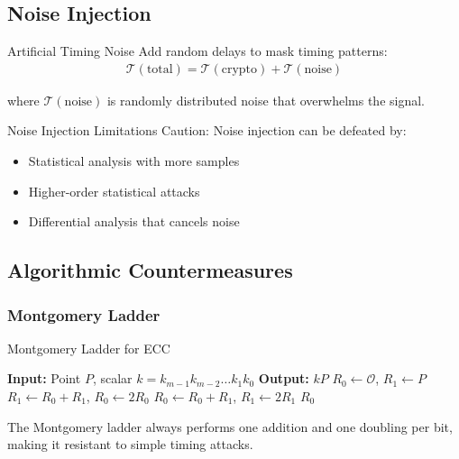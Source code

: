 \documentclass[12pt,a4paper]{article}
\theoremstyle{definition}
\newcommand{\time}[1]{\mathcal{T}\left(#1\right)}
\begin{document}
\subsection{Noise Injection}

\begin{definitionbox}{Artificial Timing Noise}
Add random delays to mask timing patterns:
\begin{align}
\time{\text{total}} = \time{\text{crypto}} + \time{\text{noise}}
\end{align}

where $\time{\text{noise}}$ is randomly distributed noise that overwhelms the signal.
\end{definitionbox}

\begin{warningbox}{Noise Injection Limitations}
Caution: Noise injection can be defeated by:
\begin{itemize}
    \item Statistical analysis with more samples
    \item Higher-order statistical attacks
    \item Differential analysis that cancels noise
\end{itemize}
\end{warningbox}

\subsection{Algorithmic Countermeasures}

\subsubsection{Montgomery Ladder}

\begin{algorithmbox}{Montgomery Ladder for ECC}
\begin{algorithmic}
\STATE \textbf{Input:} Point $P$, scalar $k = k_{m-1}k_{m-2}\ldots k_1k_0$
\STATE \textbf{Output:} $kP$
\STATE $R_0 \leftarrow \mathcal{O}$, $R_1 \leftarrow P$
        \STATE $R_1 \leftarrow R_0 + R_1$, $R_0 \leftarrow 2R_0$
    \ELSE
        \STATE $R_0 \leftarrow R_0 + R_1$, $R_1 \leftarrow 2R_1$
    \ENDIF
\ENDFOR
\RETURN $R_0$
\end{algorithmic}
\end{algorithmbox}

The Montgomery ladder always performs one addition and one doubling per bit, making it resistant to simple timing attacks.
\end{document}
